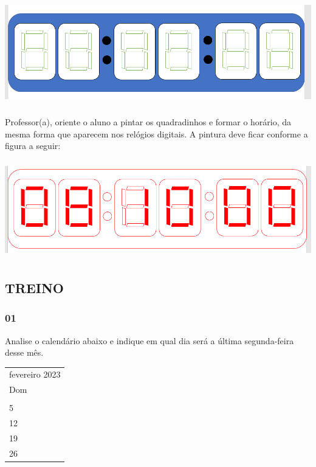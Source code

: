 \includegraphics[width=5.90556in,height=1.81944in]{media/image44.png}

Professor(a), oriente o aluno a pintar os quadradinhos e formar o
horário, da mesma forma que aparecem nos relógios digitais. A pintura
deve ficar conforme a figura a seguir:

\includegraphics[width=5.90556in,height=1.67639in]{media/image45.png}

\subsection{TREINO}\label{treino-3}

\subsubsection{01}\label{section-51}

Analise o calendário abaixo e indique em qual dia será a última
segunda-feira desse mês.

\begin{longtable}[]{@{}l@{}}
\toprule
fevereiro 2023\tabularnewline
Dom\tabularnewline
\tabularnewline
5\tabularnewline
12\tabularnewline
19\tabularnewline
26\tabularnewline
\bottomrule
\end{longtable}

